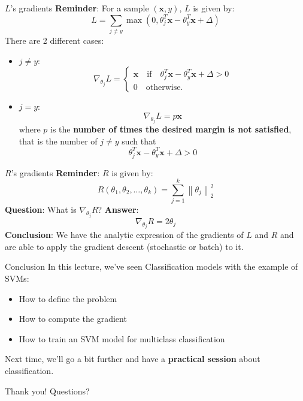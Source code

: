 \documentclass{beamer}
\newcommand{\1}[1]{\mathbbm{1}\left[#1\right]}
\newcommand{\norm}[1]{\left\lVert#1\right\rVert}
\newcommand{\bx}{\bm{x}}
\newcommand{\pv}{\pause\vfill}
\begin{document}
\begin{frame}{$L$'s gradients}
\textbf{Reminder}: For a sample $(\bx, y)$, $L$ is given by:
\begin{equation*}
L = \sum_{j \neq y} \max(0, \theta_j^T\bx - \theta_{y}^T\bx + \Delta)
\end{equation*}
There are 2 different cases:
\begin{itemize}
	\item $j \neq y$:
	\begin{equation*}
	\nabla_{\theta_j} L = 
	\begin{cases}
	\bx \quad \text{if} \quad \theta_j^T\bx - \theta_{y}^T\bx + \Delta > 0 \\
	0 \quad \text{otherwise.}
	\end{cases}
	\end{equation*}
	\item $j = y$:
	\begin{equation*}
	\nabla_{\theta_j} L = p \bx
	\end{equation*}
	where $p$ is the \textbf{number of times the desired margin is not satisfied}, that is the number of $j \neq y$ such that 
	$$\theta_j^T\bx - \theta_{y}^T\bx + \Delta > 0$$
\end{itemize}
\end{frame}

\begin{frame}{$R$'s gradients}
\textbf{Reminder}: $R$ is given by:
\begin{equation*}
R(\theta_1, \theta_2, \dots, \theta_k) = \sum_{j = 1}^k \norm{\theta_j}_2^2
\end{equation*}
\textbf{Question}: What is $\nabla_{\theta_j} R$?
\pv
\textbf{Answer}:
\begin{equation*}
\nabla_{\theta_j} R = 2\theta_j
\end{equation*}
\pv
\textbf{Conclusion}: We have the analytic expression of the gradients of $L$ and $R$ and are able to apply the gradient descent (stochastic or batch) to it.
\end{frame}

\begin{frame}{Conclusion}
In this lecture, we've seen Classification models with the example of SVMs:
\begin{itemize}
	\item How to define the problem
	\item How to compute the gradient
	\item How to train an SVM model for multiclass classification
\end{itemize}
\pv
Next time, we'll go a bit further and have a \textbf{practical session} about classification.
\end{frame}

\begin{frame}
\begin{center}
\Huge{Thank you! Questions?}
\end{center}
\end{frame}
\end{document}
